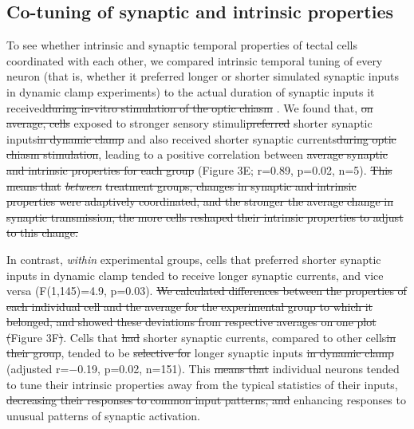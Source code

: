 \documentclass{article}
\providecommand{\DIFaddtex}[1]{{\protect\color{blue}{#1}}} %
\providecommand{\DIFdeltex}[1]{{\protect\color{red}\sout{#1}}}                      %
\providecommand{\DIFaddbegin}{} %
\providecommand{\DIFaddend}{} %
\providecommand{\DIFdelbegin}{} %
\providecommand{\DIFdelend}{} %
\providecommand{\DIFadd}[1]{\texorpdfstring{\DIFaddtex{#1}}{#1}} %
\providecommand{\DIFdel}[1]{\texorpdfstring{\DIFdeltex{#1}}{}} %
\newcommand{\DIFscaledelfig}{0.5}
\newlength{\DIFdelgraphicswidth} %
\newlength{\DIFdelgraphicsheight} %
\newcommand{\DIFaddincludegraphics}[2][]{{\color{blue}\fbox{\DIFOincludegraphics[#1]{#2}}}} %
\newcommand{\DIFdelincludegraphics}[2][]{%
\sbox{\DIFdelgraphicsbox}{\DIFOincludegraphics[#1]{#2}}%
\settoboxwidth{\DIFdelgraphicswidth}{\DIFdelgraphicsbox} %
\settoboxtotalheight{\DIFdelgraphicsheight}{\DIFdelgraphicsbox} %
\scalebox{\DIFscaledelfig}{%
\parbox[b]{\DIFdelgraphicswidth}{\usebox{\DIFdelgraphicsbox}\\[-\baselineskip] \rule{\DIFdelgraphicswidth}{0em}}\llap{\resizebox{\DIFdelgraphicswidth}{\DIFdelgraphicsheight}{%
\setlength{\unitlength}{\DIFdelgraphicswidth}%
\begin{picture}(1,1)%
\thicklines\linethickness{2pt} %
{\color[rgb]{1,0,0}\put(0,0){\framebox(1,1){}}}%
{\color[rgb]{1,0,0}\put(0,0){\line( 1,1){1}}}%
{\color[rgb]{1,0,0}\put(0,1){\line(1,-1){1}}}%
\end{picture}%
}\hspace*{3pt}}} %
} %
\DeclareRobustCommand{\DIFaddbegin}{\DIFOaddbegin \let\includegraphics\DIFaddincludegraphics} %
\DeclareRobustCommand{\DIFaddend}{\DIFOaddend \let\includegraphics\DIFOincludegraphics} %
\DeclareRobustCommand{\DIFdelbegin}{\DIFOdelbegin \let\includegraphics\DIFdelincludegraphics} %
\DeclareRobustCommand{\DIFdelend}{\DIFOaddend \let\includegraphics\DIFOincludegraphics} %
\begin{document}
\subsection*{Co-tuning of synaptic and intrinsic properties}

To see whether intrinsic and synaptic temporal properties of tectal cells coordinated with each other, we compared intrinsic temporal tuning of every neuron (that is, whether it preferred longer or shorter simulated synaptic inputs in dynamic clamp experiments) to the actual duration of synaptic inputs it received\DIFdelbegin \DIFdel{during in-vitro stimulation of the optic chiasm }\DIFdelend \DIFaddbegin \DIFadd{, assessed by optic chiasm stimulation}\DIFaddend . We found that, \DIFdelbegin \DIFdel{on average, cells }\DIFdelend \DIFaddbegin \textit{\DIFadd{on average}}\DIFadd{, in animals }\DIFaddend exposed to stronger sensory stimuli\DIFdelbegin \DIFdel{preferred }\DIFdelend \DIFaddbegin \DIFadd{, neurons were more responsive to }\DIFaddend shorter synaptic inputs\DIFdelbegin \DIFdel{in dynamic clamp }\DIFdelend \DIFaddbegin \DIFadd{, }\DIFaddend and also received shorter synaptic currents\DIFdelbegin \DIFdel{during optic chiasm stimulation}\DIFdelend , leading to a positive correlation between \DIFdelbegin \DIFdel{average synaptic and intrinsic properties for each group }\DIFdelend \DIFaddbegin \DIFadd{these values across experimental groups }\DIFaddend (Figure 3E; r=0.89, p=0.02, n=5).
\DIFdelbegin \DIFdel{This means that }\textit{\DIFdel{between}} %
\DIFdel{treatment groups, changes in synaptic and intrinsic properties were adaptively coordinated, and the stronger the average change in synaptic transmission, the more cells reshaped their intrinsic properties to adjust to this change.
}\DIFdelend 

In contrast, \textit{within} experimental groups, cells that preferred shorter synaptic inputs in dynamic clamp tended to receive longer \DIFaddbegin \DIFadd{actual }\DIFaddend synaptic currents, and vice versa (F(1,145)=4.9, p=0.03). \DIFdelbegin \DIFdel{We calculated differences between the properties of each individual cell and the average for the experimental group to which it belonged, and showed these deviations from respective averages on one plot (}\DIFdelend \DIFaddbegin \DIFadd{The deviations of neuronal properties from their respective group averages are shown in }\DIFaddend Figure 3F\DIFdelbegin \DIFdel{)}\DIFdelend . Cells that \DIFdelbegin \DIFdel{had }\DIFdelend \DIFaddbegin \DIFadd{received }\DIFaddend shorter synaptic currents, compared to other cells\DIFdelbegin \DIFdel{in their group}\DIFdelend , tended to be \DIFdelbegin \DIFdel{selective for }\DIFdelend \DIFaddbegin \DIFadd{more responsive to }\DIFaddend longer synaptic inputs \DIFdelbegin \DIFdel{in dynamic clamp }\DIFdelend (adjusted r=$-$0.19, p=0.02, n=151). This \DIFdelbegin \DIFdel{means that }\DIFdelend \DIFaddbegin \DIFadd{suggests that during normal brain development, }\DIFaddend individual neurons tended to tune their intrinsic properties away from the typical statistics of their inputs, \DIFdelbegin \DIFdel{decreasing their responses to common input patterns, and }\DIFdelend enhancing responses to unusual patterns of synaptic activation. %
\DIFdelbegin %
\end{document}
